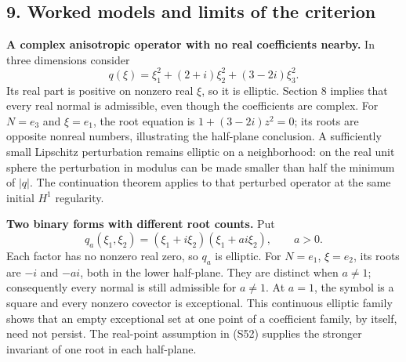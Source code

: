 \documentclass[
  11pt,
]{article}
\makeatletter
\let\ReaderOriginalAnchorStart\hyper@anchorstart
\let\ReaderOriginalAnchorEnd\hyper@anchorend
\let\ReaderPendingAliases\@empty
\def\ReaderArmAliases#1{\gdef\ReaderPendingAliases{#1}}
\def\hyper@anchorstart#1{\ReaderIfNativeAnchorTF{#1}{\ReaderPendingAliases\global\let\ReaderPendingAliases\@empty}{}\ReaderOriginalAnchorStart{#1}}
\makeatother
\begin{document}
\ReaderArmAliases{\ReaderOriginalAnchorStart{AN03-SUC-009}\ReaderOriginalAnchorEnd\begingroup\expandafter\def\csname @currentHref\endcsname{AN03-SUC-009}\label{AN03-SUC-009}\endgroup\ReaderOriginalAnchorStart{an03-suc-009-worked-models-and-limits-of-the-criterion}\ReaderOriginalAnchorEnd\begingroup\expandafter\def\csname @currentHref\endcsname{an03-suc-009-worked-models-and-limits-of-the-criterion}\label{an03-suc-009-worked-models-and-limits-of-the-criterion}\endgroup\ReaderOriginalAnchorStart{9-worked-models-and-limits-of-the-criterion}\ReaderOriginalAnchorEnd\begingroup\expandafter\def\csname @currentHref\endcsname{9-worked-models-and-limits-of-the-criterion}\label{9-worked-models-and-limits-of-the-criterion}\endgroup\ReaderOriginalAnchorStart{worked-models-and-limits-of-the-criterion}\ReaderOriginalAnchorEnd}
\subsection{9. Worked models and limits of the
criterion}\label{worked-models-and-limits-of-the-criterion}

\textbf{A complex anisotropic operator with no real coefficients
nearby.} In three dimensions consider \[
 q(\xi)=\xi_1^2+(2+i)\xi_2^2+(3-2i)\xi_3^2.
\] Its real part is positive on nonzero real \(\xi\), so it is elliptic.
Section 8 implies that every real normal is admissible, even though the
coefficients are complex. For \(N=e_3\) and \(\xi=e_1\), the root
equation is \(1+(3-2i)z^2=0\); its roots are opposite nonreal numbers,
illustrating the half-plane conclusion. A sufficiently small Lipschitz
perturbation remains elliptic on a neighborhood: on the real unit sphere
the perturbation in modulus can be made smaller than half the minimum of
\(|q|\). The continuation theorem applies to that perturbed operator at
the same initial \(H^1\) regularity.

\textbf{Two binary forms with different root counts.} Put \[
 q_a(\xi_1,\xi_2)=(\xi_1+i\xi_2)(\xi_1+ai\xi_2),\qquad a>0.
\] Each factor has no nonzero real zero, so \(q_a\) is elliptic. For
\(N=e_1\), \(\xi=e_2\), its roots are \(-i\) and \(-ai\), both in the
lower half-plane. They are distinct when \(a\ne1\); consequently every
normal is still admissible for \(a\ne1\). At \(a=1\), the symbol is a
square and every nonzero covector is exceptional. This continuous
elliptic family shows that an empty exceptional set at one point of a
coefficient family, by itself, need not persist. The real-point
assumption in (S52) supplies the stronger invariant of one root in each
half-plane.
\end{document}
